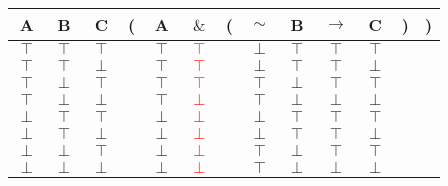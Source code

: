 \documentclass[11pt]{article}
\begin{document}
\begin{tabular}{ c  c  c | c  c  c  c  c  c  c  c  c  c }
A & B & C & ( & A & $\&$ & ( & $\sim$ & B & $\rightarrow$ & C & ) & )\\
\hline 
$\top$ & $\top$ & $\top$ &  & $\top$ & \textcolor{red}{$\top$} &  & $\perp$ & $\top$ & $\top$ & $\top$ &  & \\
$\top$ & $\top$ & $\perp$ &  & $\top$ & \textcolor{red}{$\top$} &  & $\perp$ & $\top$ & $\top$ & $\perp$ &  & \\
$\top$ & $\perp$ & $\top$ &  & $\top$ & \textcolor{red}{$\top$} &  & $\top$ & $\perp$ & $\top$ & $\top$ &  & \\
$\top$ & $\perp$ & $\perp$ &  & $\top$ & \textcolor{red}{$\perp$} &  & $\top$ & $\perp$ & $\perp$ & $\perp$ &  & \\
$\perp$ & $\top$ & $\top$ &  & $\perp$ & \textcolor{red}{$\perp$} &  & $\perp$ & $\top$ & $\top$ & $\top$ &  & \\
$\perp$ & $\top$ & $\perp$ &  & $\perp$ & \textcolor{red}{$\perp$} &  & $\perp$ & $\top$ & $\top$ & $\perp$ &  & \\
$\perp$ & $\perp$ & $\top$ &  & $\perp$ & \textcolor{red}{$\perp$} &  & $\top$ & $\perp$ & $\top$ & $\top$ &  & \\
$\perp$ & $\perp$ & $\perp$ &  & $\perp$ & \textcolor{red}{$\perp$} &  & $\top$ & $\perp$ & $\perp$ & $\perp$ &  & \\
\end{tabular}

\vspace{2em}
\end{document}
